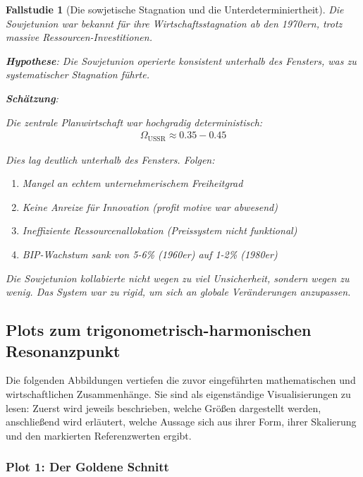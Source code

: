\documentclass[a4paper, 12pt, twoside, openright]{report}
\newtheorem{fallstudie}{Fallstudie}
\theoremstyle{definition}
\theoremstyle{definition}
\begin{document}
\begin{fallstudie}[Die sowjetische Stagnation und die Unterdeterminiertheit]

Die Sowjetunion war bekannt für ihre Wirtschaftsstagnation ab den 1970ern, trotz massive Ressourcen-Investitionen.

\textbf{Hypothese}: Die Sowjetunion operierte konsistent unterhalb des Fensters, was zu systematischer Stagnation führte.

\textbf{Schätzung}:

Die zentrale Planwirtschaft war hochgradig deterministisch:
\begin{align}
\Omega_{\text{USSR}} \approx 0.35-0.45
\end{align}

Dies lag deutlich unterhalb des Fensters. Folgen:
\begin{enumerate}
	\item Mangel an echtem unternehmerischem Freiheitgrad
	\item Keine Anreize für Innovation (profit motive war abwesend)
	\item Ineffiziente Ressourcenallokation (Preissystem nicht funktional)
	\item BIP-Wachstum sank von 5-6\% (1960er) auf 1-2\% (1980er)
\end{enumerate}

Die Sowjetunion kollabierte nicht wegen zu viel Unsicherheit, sondern wegen zu wenig. Das System war zu rigid, um sich an globale Veränderungen anzupassen.

\end{fallstudie}

\subsection{Plots zum trigonometrisch-harmonischen Resonanzpunkt}

Die folgenden Abbildungen vertiefen die zuvor eingeführten mathematischen und wirtschaftlichen Zusammenhänge. Sie sind als eigenständige Visualisierungen zu lesen: Zuerst wird jeweils beschrieben, welche Größen dargestellt werden, anschließend wird erläutert, welche Aussage sich aus ihrer Form, ihrer Skalierung und den markierten Referenzwerten ergibt.

\subsubsection{Plot 1: Der Goldene Schnitt}
\end{document}
